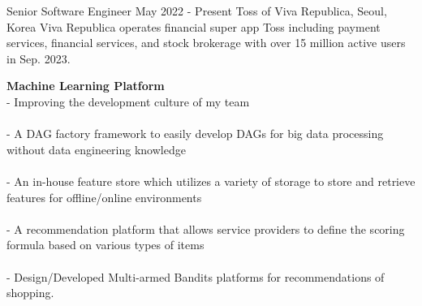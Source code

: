 

\begin{cventries}
    \cventry
        {Senior Software Engineer} %
        {May 2022 - Present} %
        {Toss of Viva Republica, } %
        {Seoul, Korea}%
        { %
            Viva Republica operates financial super app Toss including payment services, financial services, and stock brokerage with over 15 million active users in Sep. 2023.
        }
        { %
            \begin{cvitems}
                \item {
                    {\bf Machine Learning Platform} \\
                    - Improving the development culture of my team \\
                         \\
                    - A DAG factory framework to easily develop DAGs for big data processing without data engineering knowledge \\
                         \\
                    - An in-house feature store which utilizes a variety of storage to store and retrieve features for offline/online environments \\
                         \\
                    - A recommendation platform that allows service providers to define the scoring formula based on various types of items \\
                         \\
                    - Design/Developed Multi-armed Bandits platforms for recommendations of shopping. \\
                         \nn
                }
            \end{cvitems}
        }


\end{cventries}
